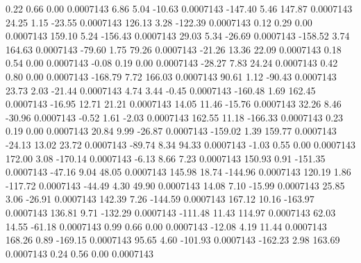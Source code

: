         0.22        0.66        0.00     0.0007143
        6.86        5.04      -10.63     0.0007143
     -147.40        5.46      147.87     0.0007143
       24.25        1.15      -23.55     0.0007143
      126.13        3.28     -122.39     0.0007143
        0.12        0.29        0.00     0.0007143
      159.10        5.24     -156.43     0.0007143
       29.03        5.34      -26.69     0.0007143
     -158.52        3.74      164.63     0.0007143
      -79.60        1.75       79.26     0.0007143
      -21.26       13.36       22.09     0.0007143
        0.18        0.54        0.00     0.0007143
       -0.08        0.19        0.00     0.0007143
      -28.27        7.83       24.24     0.0007143
        0.42        0.80        0.00     0.0007143
     -168.79        7.72      166.03     0.0007143
       90.61        1.12      -90.43     0.0007143
       23.73        2.03      -21.44     0.0007143
        4.74        3.44       -0.45     0.0007143
     -160.48        1.69      162.45     0.0007143
      -16.95       12.71       21.21     0.0007143
       14.05       11.46      -15.76     0.0007143
       32.26        8.46      -30.96     0.0007143
       -0.52        1.61       -2.03     0.0007143
      162.55       11.18     -166.33     0.0007143
        0.23        0.19        0.00     0.0007143
       20.84        9.99      -26.87     0.0007143
     -159.02        1.39      159.77     0.0007143
      -24.13       13.02       23.72     0.0007143
      -89.74        8.34       94.33     0.0007143
       -1.03        0.55        0.00     0.0007143
      172.00        3.08     -170.14     0.0007143
       -6.13        8.66        7.23     0.0007143
      150.93        0.91     -151.35     0.0007143
      -47.16        9.04       48.05     0.0007143
      145.98       18.74     -144.96     0.0007143
      120.19        1.86     -117.72     0.0007143
      -44.49        4.30       49.90     0.0007143
       14.08        7.10      -15.99     0.0007143
       25.85        3.06      -26.91     0.0007143
      142.39        7.26     -144.59     0.0007143
      167.12       10.16     -163.97     0.0007143
      136.81        9.71     -132.29     0.0007143
     -111.48       11.43      114.97     0.0007143
       62.03       14.55      -61.18     0.0007143
        0.99        0.66        0.00     0.0007143
      -12.08        4.19       11.44     0.0007143
      168.26        0.89     -169.15     0.0007143
       95.65        4.60     -101.93     0.0007143
     -162.23        2.98      163.69     0.0007143
        0.24        0.56        0.00     0.0007143
